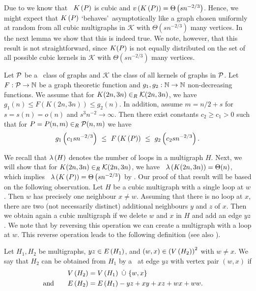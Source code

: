 Due to  we know that \whp\ $K\left(P\right)$ is cubic and $v\left({K\left(P\right)}\right)=\Theta\left(sn^{-2/3}\right)$. Hence, we might expect that $K\left(P\right)$ \lq behaves\rq\ asymptotically like a graph chosen uniformly at random from all cubic multigraphs in $\mathcal{K}$ with $\Theta\left(sn^{-2/3}\right)$ many vertices. In the next lemma we show that this is indeed true. We note, however, that this result is not straightforward, since $K(P)$ is not equally distributed on the set of all possible cubic kernels in $\mathcal{K}$ with $\Theta\left(sn^{-2/3}\right)$ many vertices.
\begin{lem}\label{CBlem:kernel_cubic}
	Let $\mathcal{P}$ be a \pl\ class of graphs and $\mathcal{K}$ the class of all kernels of graphs in $\mathcal{P}$. Let $F:\mathcal{P} \to \mathbb{N}$ be a graph theoretic function and $g_1, g_2:\mathbb{N} \to \mathbb{N}$ non-decreasing functions. We assume that for $K(2n,3n)\in_R \mathcal{K}(2n,3n)$, we have \whp\ $g_1(n)\leq F(K(2n,3n))\leq g_2(n)$. In addition, assume $m=n/2+s$ for $s=s(n)=o(n)$ and $s^3n^{-2} \to \infty$. Then there exist constants $c_2\geq c_1>0$ such that for $P=P(n,m)\in_R \mathcal {P}(n,m)$ we have \whp
	\[
	g_1\left(c_1sn^{-2/3}\right)\ \leq\ F\left(\kernel{\planarRandomGraph}\right)\ \leq\ g_2\left(c_2sn^{-2/3}\right).
	\]
\end{lem}

We recall that $\lambda\left(H\right)$ denotes the number of loops in a multigraph $H$. Next, we will show that for $K(2n,3n)\in_R \mathcal{K}(2n,3n)$, we have \whp\ $\lambda\left(K(2n,3n)\right)=\Theta(n)$, which implies \whp\ $\lambda\left(K\left(P\right)\right)=\Theta\left(sn^{-2/3}\right)$ by . Our proof of that result will be based on the following observation. Let $H$ be a cubic multigraph with a single loop at $w$. Then $w$ has precisely one neighbour $x\neq w$. Assuming that there is no loop at $x$, there are two (not necessarily distinct) additional neighbours $y$ and $z$ of $x$. Then we obtain again a cubic multigraph if we delete $w$ and $x$ in $H$ and add an edge $yz$. We note that by reversing this operation we can create a multigraph with a loop at $w$. This reverse operation leads to the following definition (see also ).
\begin{definition}[\LoopInsertion]\label{CBdef:loop_insertion}
	Let $H_1, H_2$ be multigraphs, $yz\in E\left(H_1\right)$, and $(w, x)\in \left(V\left(H_2\right)\right)^2$ with $w\neq x$. We say that $H_2$ can be obtained from $H_1$ by a {\em\loopInsertion}\ at edge $yz$ with vertex pair $(w,x)$ if 
	\begin{align*}
	V\left(H_2\right)&=V\left(H_1\right)~\dot\cup~\{w,x\}\\
\text{ and }~~~~~	E\left(H_2\right)&=E\left(H_1\right)-yz+xy+xz+wx+ww.~~~~~
	\end{align*}
\end{definition}

